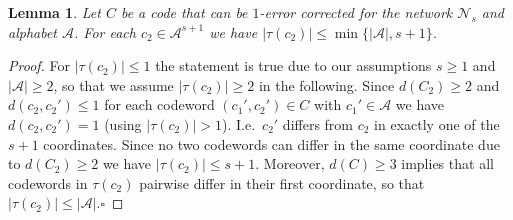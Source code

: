 \documentclass[11pt]{article}
\newcommand{\cA}{\mathcal{A}}
\newcommand{\cN}{\mathcal{N}}
\newtheorem{lemma}[theorem]{Lemma}
\begin{document}

\begin{lemma}
  Let $C$ be a code that can be $1$-error corrected for the network $\cN_s$ and alphabet $\cA$. For each $c_2\in\cA^{s+1}$ we have $|\tau(c_2)|\le 
  \min\{|\cA|,s+1\}$.
\end{lemma}
\begin{proof}
  For $|\tau(c_2)|\le 1$ the statement is true due to our assumptions $s\ge 1$ and $|\cA|\ge 2$, so that we assume $|\tau(c_2)|\ge 2$ in the following.  
  Since $d(C_2)\ge 2$ and $d(c_2,c_2')\le 1$ for each codeword $(c_1',c_2')\in C$ with $c_1'\in\cA$ we have $d(c_2,c_2')=1$ (using $|\tau(c_2)|>1$). I.e.\ $c_2'$ 
  differs from $c_2$ in exactly one of the $s+1$ coordinates. Since no two codewords can differ in the same coordinate due to $d(C_2)\ge 2$ we have $|\tau(c_2)|\le s+1$. 
  Moreover, $d(C)\ge 3$ implies that all codewords in $\tau(c_2)$ pairwise differ in their first coordinate, so that $|\tau(c_2)|\le |\cA|$.\hfill{$\square$} 
\end{proof}
\end{document}

